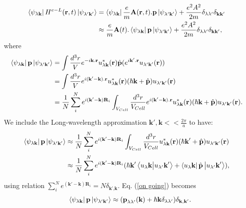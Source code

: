 \documentclass[12pt,english,a4paper]{article}
\begin{document}
	\begin{align}
		\bra{\psi_{\lambda\textbf{k}}}H^{e-L}(\textbf{r},t)\ket{\psi_{\lambda'\textbf{k}'}} &= \bra{\psi_{\lambda\textbf{k}}}\frac{e}{m}\textbf{A}(\textbf{r},t).\textbf{p}\ket{\psi_{\lambda'\textbf{k}'}} +\frac{e^2 A^2}{2m} \delta_{\lambda \lambda'}\delta_{\textbf{k}\textbf{k}'} \nonumber\\
		&\approx \frac{e}{m}\textbf{A}(t). \bra{\psi_{\lambda\textbf{k}}}\textbf{p}\ket{\psi_{\lambda'\textbf{k}'}} + \frac{e^2 A^2}{2m} \delta_{\lambda \lambda'}\delta_{\textbf{k}\textbf{k}'},
	\end{align}
where
	\begin{align}
		\bra{\psi_{\lambda\textbf{k}}}\textbf{p}\ket{\psi_{\lambda'\textbf{k}'}} &= \int \frac{d^3 r}{V} e^{-i\textbf{k}.\textbf{r}}u^{*}_{\lambda \textbf{k}}(\textbf{r}) \hat{\textbf{p}}(e^{i\textbf{k}'.\textbf{r}} u_{\lambda'\textbf{k}'}(\textbf{r})) \nonumber \\
		& =	\int \frac{d^3 r}{V} e^{i(\textbf{k}'-\textbf{k}).\textbf{r}}u^{*}_{\lambda \textbf{k}}(\textbf{r}) (\hbar \textbf{k}+\hat{\textbf{p}}) u_{\lambda'\textbf{k}'}(\textbf{r}) \nonumber \\
		\label{p before wave approximate}
		& = \frac{1}{N} \sum_{i}^{N} e^{i(\textbf{k}'-\textbf{k})\textbf{R}_i} \int_{V_{Cell}} \frac{d^3r}{V_{Cell}}e^{i(\textbf{k}'-\textbf{k}).\textbf{r}}u^{*}_{\lambda \textbf{k}}(\textbf{r}) (\hbar \textbf{k}+\hat{\textbf{p}}) u_{\lambda'\textbf{k}'}(\textbf{r}).
	\end{align}
\quad We include the Long-wavelength approximation $\textbf{k}',\textbf{k} << \frac{2\pi}{a}$ to have:
	\begin{align}
		\bra{\psi_{\lambda\textbf{k}}}\textbf{p}\ket{\psi_{\lambda'\textbf{k}'}} &\approx \frac{1}{N} \sum_{i}^{N} e^{i(\textbf{k}'-\textbf{k})\textbf{R}_i} \int_{V_{Cell}} \frac{d^3r}{V_{Cell}}u^{*}_{\lambda \textbf{k}}(\textbf{r}) (\hbar \textbf{k}'+\hat{\textbf{p}}) u_{\lambda'\textbf{k}'}(\textbf{r})\nonumber \\
		& \approx \frac{1}{N} \sum_{i}^{N} e^{i(\textbf{k}'-\textbf{k})\textbf{R}_i} (\hbar \textbf{k}' \bra{u_\lambda \textbf{k}} \ket{u_{\lambda'}\textbf{k}'} + \bra{u_\lambda \textbf{k}} \hat{\textbf{p}}\ket{u_{\lambda'}\textbf{k}'}),
		\label{on going}
	\end{align}
	\quad using relation $
\sum_{i}^{N} e^{(\textbf{k}'-\textbf{k})\textbf{R}_i}= N\delta_{\textbf{k'},\textbf{k}}$. Eq. (\ref{on going}) becomes
	\begin{equation}
		\label{p after LWA}
		\quad \bra{\psi_{\lambda\textbf{k}}}\textbf{p}\ket{\psi_{\lambda'\textbf{k}'}} \approx (\textbf{p}_{\lambda\lambda'}(\textbf{k}) + \hbar \textbf{k} \delta_{\lambda\lambda'}) \delta_{\textbf{k}, \textbf{k}'}.
	\end{equation}
\end{document}
